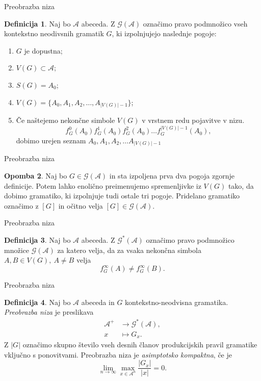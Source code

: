 \documentclass{beamer}
\newcommand{\G}{\mathcal{G}}
\newcommand{\A}{\mathcal{A}}
\theoremstyle{definition} %
\newtheorem{definicija}{Definicija}[section]
\newtheorem{opomba}[definicija]{Opomba}
\begin{document}
\begin{frame}{Preobrazba niza}
    \begin{definicija}
        Naj bo $\A$ abeceda. Z $ \G(\A) $ označimo pravo podmnožico vseh kontekstno neodivsnih gramatik
        $G$, ki izpolnjujejo naslednje pogoje:
        \begin{enumerate}
            \item<1-> $G$ je dopustna;
            \item<2-> $ V(G) \subset \A $;
            \item<3->$ S(G) = A_0 $;
            \item<4-> $ V(G) = \{ A_0, A_1, A_2, \ldots, A_{|V(G)| - 1} \} $;
            \item<5-> Če naštejemo nekončne simbole $V(G)$ v vrstnem redu pojavitve v nizu.
            \[
            f_G^0(A_0) f_G^1(A_0) f_G^2(A_0) \dots f_G^{|V(G)| - 1}(A_0),
            \]
            dobimo urejen seznam $ A_0, A_1, A_2, \ldots A_{|V(G)| - 1} $
        \end{enumerate}
    \end{definicija}
\end{frame}

\begin{frame}{Preobrazba niza}
    \begin{opomba}
         Naj bo $ G \in \G(\A) $ in sta izpoljena prva dva pogoja zgornje definicije.
         Potem lahko enolično preimenujemo spremenljivke iz $ V(G) $ tako, da dobimo gramatiko, ki izpolnjuje tudi ostale tri pogoje. Pridelano gramatiko označimo z $[G]$ in očitno velja $[G] \in \G(\A) $.
    \end{opomba}
\end{frame}

\begin{frame}{Preobrazba niza}
    \begin{definicija}
        Naj bo $\A$ abeceda. Z $\G^*(\A)$ označimo pravo podmnožico množice $\G(\A)$ za katero velja, da za vsaka nekončna simbola $ A,B \in V(G), \ A \neq B $ velja
        \[
            f_G^\infty(A) \neq f_G^\infty(B).
        \]
    \end{definicija}
\end{frame}

\begin{frame}{Preobrazba niza}
    \begin{definicija}
        Naj bo $\A$ abeceda in $G$ kontekstno-neodvisna gramatika. 
        \textit{Preobrazba niza} je preslikava
        \begin{align*}
            \A^+ &\rightarrow \G^*(\A), \\
            x &\mapsto G_x.
        \end{align*}
        \pause
        Z $|G|$ označimo skupno število vseh desnih članov produkcijskih pravil gramatike vključno s ponovitvami. Preobrazba niza je \textit{asimptotsko kompaktna}, če je
        \[
            \lim_{n \rightarrow \infty} \max_{x \in \A^n} \frac{|G_x|}{|x|} = 0.
        \]
    \end{definicija}
\end{frame}
\end{document}
